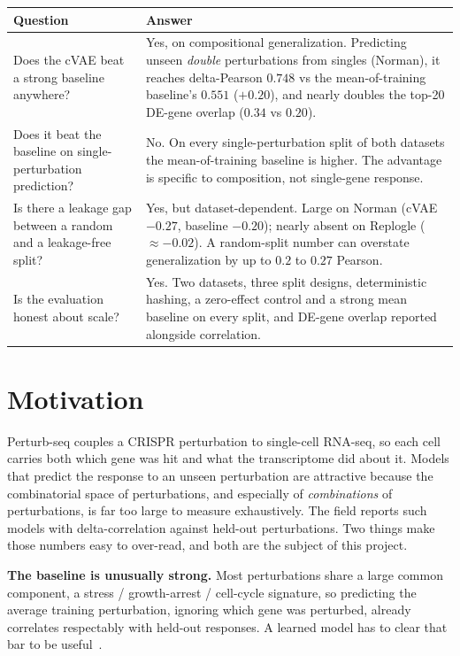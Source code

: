 \documentclass[11pt]{article}
\begin{document}
\begin{center}
\begin{tabular}{@{}L{0.46\textwidth} L{0.46\textwidth}@{}}
\toprule
\textbf{Question} & \textbf{Answer} \\
\midrule
Does the cVAE beat a strong baseline anywhere? & Yes, on compositional generalization. Predicting unseen \emph{double} perturbations from singles (Norman), it reaches delta-Pearson $0.748$ vs the mean-of-training baseline's $0.551$ ($+0.20$), and nearly doubles the top-20 DE-gene overlap ($0.34$ vs $0.20$). \\
\addlinespace
Does it beat the baseline on single-perturbation prediction? & No. On every single-perturbation split of both datasets the mean-of-training baseline is higher. The advantage is specific to composition, not single-gene response. \\
\addlinespace
Is there a leakage gap between a random and a leakage-free split? & Yes, but dataset-dependent. Large on Norman (cVAE $-0.27$, baseline $-0.20$); nearly absent on Replogle ($\approx-0.02$). A random-split number can overstate generalization by up to $0.2$ to $0.27$ Pearson. \\
\addlinespace
Is the evaluation honest about scale? & Yes. Two datasets, three split designs, deterministic hashing, a zero-effect control and a strong mean baseline on every split, and DE-gene overlap reported alongside correlation. \\
\bottomrule
\end{tabular}
\end{center}

\clearpage
\section{Motivation}

Perturb-seq couples a CRISPR perturbation to single-cell RNA-seq, so each cell
carries both which gene was hit and what the transcriptome did about it. Models
that predict the response to an unseen perturbation are attractive because the
combinatorial space of perturbations, and especially of \emph{combinations} of
perturbations, is far too large to measure exhaustively. The field reports such
models with delta-correlation against held-out perturbations. Two things make
those numbers easy to over-read, and both are the subject of this project.

\textbf{The baseline is unusually strong.} Most perturbations share a large
common component, a stress / growth-arrest / cell-cycle signature, so predicting
the average training perturbation, ignoring which gene was perturbed, already
correlates respectably with held-out responses. A learned model has to clear that
bar to be useful~\cite{ahlmann2024,kernfeld2023}.
\end{document}
